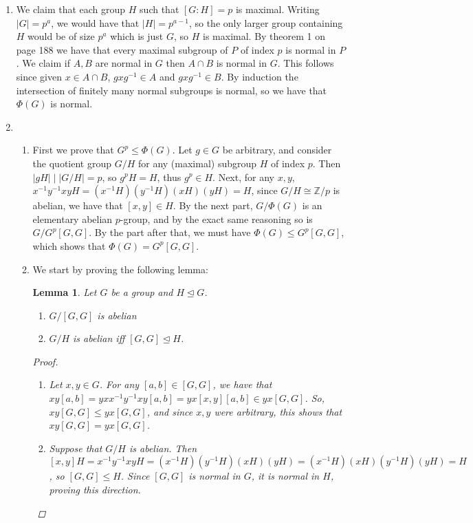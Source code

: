 \documentclass[12pt]{article}
\newtheorem{lemma}{Lemma}
\theoremstyle{definitionstyle}
\def\mbb#1{\mathbb{#1}}
\newcommand{\Z}{\mbb Z}
\newcommand{\nsg}{\trianglelefteq}
\begin{document}
\begin{enumerate}[leftmargin=\labelsep]
\begin{enumerate}
			
		\end{enumerate}
		
		\item We claim that each group $H$ such that $[G : H] = p$ is maximal. Writing $|G| = p^a$, we would have that $|H| = p^{a-1}$, so the only larger group containing $H$ would be of size $p^a$ which is just $G$, so $H$ is maximal. By theorem 1 on page 188 we have that every maximal subgroup of $P$ of index $p$ is normal in $P$. We claim if $A, B$ are normal in $G$ then $A \cap B$ is normal in $G$. This follows since given $x \in A \cap B$, $gxg^{-1} \in A$ and $gxg^{-1} \in B$. By induction the intersection of finitely many normal subgroups is normal, so we have that $\Phi(G)$ is normal.
		
		\item
		\begin{enumerate}
			\item First we prove that $G^p \leq \Phi(G)$. Let $g \in G$ be arbitrary, and consider the quotient group $G/H$ for any (maximal) subgroup $H$ of index $p$. Then $|gH| \mid |G/H| = p$, so $g^pH = H$, thus $g^p \in H$. Next, for any $x, y$, $x^{-1}y^{-1}xyH = (x^{-1}H)(y^{-1}H)(xH)(yH) = H$, since $G/H \cong \Z/p$ is abelian, we have that $[x, y] \in H$. By the next part, $G/\Phi(G)$ is an elementary abelian $p$-group, and by the exact same reasoning so is $G/G^p[G,G]$. By the part after that, we must have $\Phi(G) \leq G^p[G,G]$, which shows that $\Phi(G) = G^p[G, G]$.
			
			\item We start by proving the following lemma:
			\begin{lemma}
				Let $G$ be a group and $H \nsg G$. 
				\begin{enumerate}[label=(\arabic*)]
					\item $G/[G,G]$ is abelian
					\item $G/H$ is abelian iff $[G,G] \nsg H$.
				\end{enumerate}
				\begin{proof}
					\begin{enumerate}[label=(\arabic*)]
						\item Let $x, y \in G$. For any $[a, b] \in [G,G]$, we have that $xy[a,b] = yxx^{-1}y^{-1}xy[a,b] = yx[x, y][a,b] \in yx[G,G]$. So, $xy[G,G] \leq yx[G,G]$, and since $x,y$ were arbitrary, this shows that $xy[G,G] = yx[G,G]$.
						\item Suppose that $G/H$ is abelian. Then $[x,y]H = x^{-1}y^{-1}xyH = (x^{-1}H)(y^{-1}H)(xH)(yH) = (x^{-1}H)(xH)(y^{-1}H)(yH) = H$, so $[G, G] \leq H$. Since $[G,G]$ is normal in $G$, it is normal in $H$, proving this direction.
						

\end{enumerate}
\end{proof}
\end{lemma}
\end{enumerate}
\end{enumerate}
\end{document}
